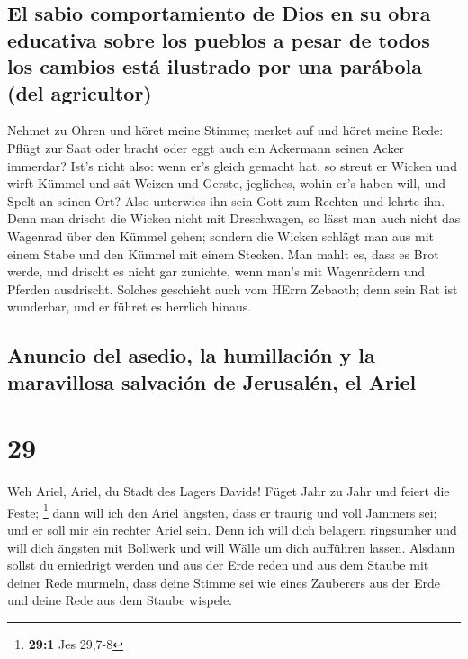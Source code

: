 \hypertarget{el-sabio-comportamiento-de-dios-en-su-obra-educativa-sobre-los-pueblos-a-pesar-de-todos-los-cambios-estuxe1-ilustrado-por-una-paruxe1bola-del-agricultor}{%
\subsection{El sabio comportamiento de Dios en su obra educativa sobre
los pueblos a pesar de todos los cambios está ilustrado por una parábola
(del
agricultor)}\label{el-sabio-comportamiento-de-dios-en-su-obra-educativa-sobre-los-pueblos-a-pesar-de-todos-los-cambios-estuxe1-ilustrado-por-una-paruxe1bola-del-agricultor}}

 Nehmet zu Ohren und höret meine Stimme; merket auf und
höret meine Rede:  Pflügt zur Saat oder bracht oder eggt
auch ein Ackermann seinen Acker immerdar?  Ist's nicht
also: wenn er's gleich gemacht hat, so streut er Wicken und wirft Kümmel
und sät Weizen und Gerste, jegliches, wohin er's haben will, und Spelt
an seinen Ort?  Also unterwies ihn sein Gott zum Rechten
und lehrte ihn.  Denn man drischt die Wicken nicht mit
Dreschwagen, so lässt man auch nicht das Wagenrad über den Kümmel gehen;
sondern die Wicken schlägt man aus mit einem Stabe und den Kümmel mit
einem Stecken.  Man mahlt es, dass es Brot werde, und
drischt es nicht gar zunichte, wenn man's mit Wagenrädern und Pferden
ausdrischt.  Solches geschieht auch vom HErrn Zebaoth;
denn sein Rat ist wunderbar, und er führet es herrlich hinaus.

\hypertarget{anuncio-del-asedio-la-humillaciuxf3n-y-la-maravillosa-salvaciuxf3n-de-jerusaluxe9n-el-ariel}{%
\subsection{Anuncio del asedio, la humillación y la maravillosa
salvación de Jerusalén, el
Ariel}\label{anuncio-del-asedio-la-humillaciuxf3n-y-la-maravillosa-salvaciuxf3n-de-jerusaluxe9n-el-ariel}}

\hypertarget{section-28}{%
\section{29}\label{section-28}}

 Weh Ariel, Ariel, du Stadt des Lagers Davids! Füget Jahr
zu Jahr und feiert die Feste; \footnote{\textbf{29:1} Jes 29,7-8}
 dann will ich den Ariel ängsten, dass er traurig und voll
Jammers sei; und er soll mir ein rechter Ariel sein.  Denn
ich will dich belagern ringsumher und will dich ängsten mit Bollwerk und
will Wälle um dich aufführen lassen.  Alsdann sollst du
erniedrigt werden und aus der Erde reden und aus dem Staube mit deiner
Rede murmeln, dass deine Stimme sei wie eines Zauberers aus der Erde und
deine Rede aus dem Staube wispele.

